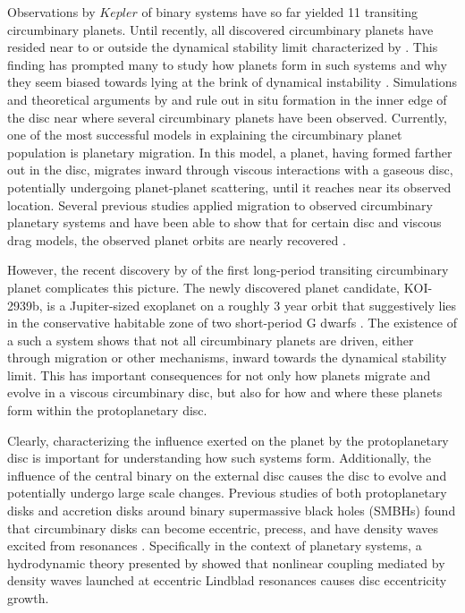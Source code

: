 Observations by $Kepler$ of binary systems have so far yielded 11 transiting circumbinary planets.  Until recently, all discovered circumbinary planets have resided near to or outside the dynamical stability limit characterized by \citet{Dvorak1986,Holman1999}.  This
finding has prompted many to study how planets form in such systems and why they seem biased towards lying at the brink of dynamical instability \citep{Welsh2014,Pierens2013}.  Simulations and theoretical arguments by \citet{Pelupessy2013} and \citet{Bromley2015} rule out in situ formation
in the inner edge of the disc near where several circumbinary planets have been observed.  Currently, one of the most successful models in explaining the circumbinary planet population is planetary migration.  
In this model, a planet, having formed farther out in the disc, migrates inward through viscous interactions with a gaseous disc, potentially undergoing planet-planet scattering, until it reaches near its observed location.  Several previous studies applied migration to observed circumbinary planetary systems and have been able to show that for certain disc and viscous drag models, the observed planet orbits are nearly recovered \citep[e.g.][]{Kley2014,Kley2015,Pierens2007,Pierens2013}.

However, the recent discovery by \citet{Kostov2016} of the first long-period transiting circumbinary planet complicates this picture.  The newly discovered planet candidate, KOI-2939b, is a Jupiter-sized exoplanet on a roughly 3 year orbit that suggestively lies in the conservative habitable zone of two short-period G dwarfs \citep{Kostov2016}.  The existence of a such a system shows that not all circumbinary planets are driven, either through migration or other mechanisms, inward towards the dynamical stability limit.  This has important consequences for not only how planets migrate and evolve in a viscous circumbinary disc, but also for how and where these planets form within the protoplanetary disc.

Clearly, characterizing the influence exerted on the planet by the protoplanetary disc is important for understanding how such systems form.  Additionally, the influence of the central binary on the external disc causes the disc to evolve and potentially undergo large scale changes.  Previous studies of both protoplanetary disks and accretion disks around binary supermassive black holes (SMBHs) found that circumbinary disks can become eccentric, precess, and have density waves excited from resonances \citep{Dunhill2015,MacFadyen2008,Papaloizou2001,Pierens2007,Pierens2013,Roedig2012}.  Specifically in the context of planetary systems, a hydrodynamic theory presented by \citet{Lubow1991} showed that nonlinear coupling mediated by density waves launched at eccentric Lindblad resonances causes disc eccentricity growth. 

